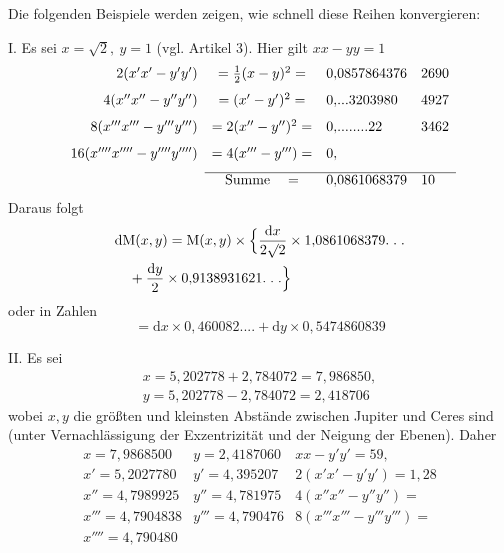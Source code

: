 \begingroup
\renewcommand{\arraystretch}{1.45}
Die folgenden Beispiele werden zeigen, wie schnell diese Reihen konvergieren:

\par I. Es sei \(x=\surd 2,\ y=1\) (vgl. Artikel 3). Hier gilt \(xx-yy=1\)
\begingroup\small\setlength{\arraycolsep}{3pt}
\[
\begin{array}{rcll}
2(x'x'-y'y')&=\tfrac12(x-y)^2=&0{,}0857864376&2690\\[7pt]
4(x''x''-y''y'')&=(x'-y')^2=&0{,}\mathord{.}\mathord{.}\mathord{.}3203980&4927\\[7pt]
8(x'''x'''-y'''y''')&=2(x''-y'')^2=&0{,}\mathord{.}\mathord{.}\mathord{.}\mathord{.}\mathord{.}\mathord{.}\mathord{.}\mathord{.}22&3462\\[7pt]
16(x''''x''''-y''''y'''')&=4(x'''-y''')=&0{,}&\\[7pt]
\cline{2-4}
&\mathrm{Summe}\quad=&0{,}0861068379&10
\end{array}
\]
\endgroup
Daraus folgt
\[
\begin{aligned}&\mathrm{d}\mathrm{M}(x,y)=\mathrm{M}(x,y)\times
\Bigl\{\frac{\mathrm{d}x}{2\surd 2}\times1{,}0861068379.\;.\;.\\&\quad+\frac{\mathrm{d}y}{2}\times0{,}9138931621.\;.\;.\Bigr\}\end{aligned}
\]
oder in Zahlen
\[
=\mathrm{d}x\times0{,}460082\mathord{.}\mathord{.}\mathord{.}\mathord{.}
+\mathrm{d}y\times0{,}5474860839
\]
\par II. Es sei
\[
\begin{gathered}x=5{,}202778+2{,}784072=7{,}986850,\\[7pt]
y=5{,}202778-2{,}784072=2{,}418706\end{gathered}
\]
wobei \(x,y\) die größten und kleinsten Abstände zwischen Jupiter und Ceres sind (unter Vernachlässigung der Exzentrizität und der Neigung der Ebenen). Daher
\begingroup\small\setlength{\arraycolsep}{3pt}
\[
\begin{array}{lll}
x=7{,}9868500&y=2{,}4187060&xx-y'y'=59{,}\\[7pt]
x'=5{,}2027780&y'=4{,}395207&2(x'x'-y'y')=1{,}28\\[7pt]
x''=4{,}7989925&y''=4{,}781975&4(x''x''-y''y'')=\\[7pt]
x'''=4{,}7904838&y'''=4{,}790476&8(x'''x'''-y'''y''')=\\[7pt]
x''''=4{,}790480&&
\end{array}
\]
\endgroup

\clearpage
\endgroup
